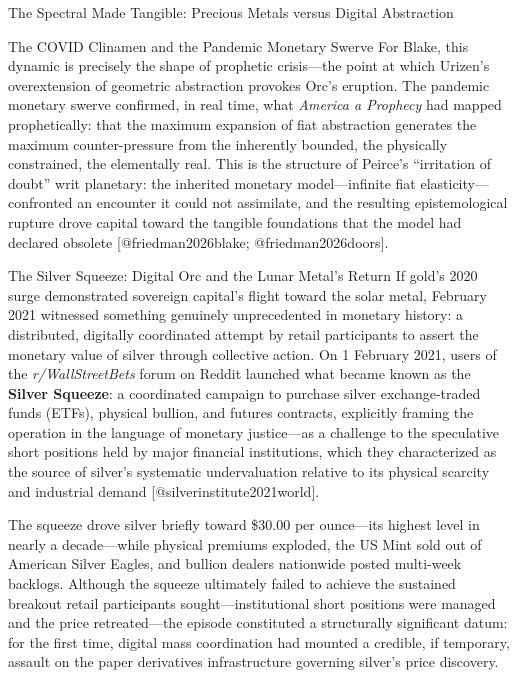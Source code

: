 \documentclass[
  ignorenonframetext,
]{beamer}
\begin{document}
\begin{frame}{The Spectral Made Tangible: Precious Metals versus Digital
Abstraction}
\begin{block}{The COVID Clinamen and the Pandemic Monetary Swerve}
For Blake, this dynamic is precisely the shape of prophetic crisis---the
point at which Urizen's overextension of geometric abstraction provokes
Orc's eruption. The pandemic monetary swerve confirmed, in real time,
what \emph{America a Prophecy} had mapped prophetically: that the
maximum expansion of fiat abstraction generates the maximum
counter-pressure from the inherently bounded, the physically
constrained, the elementally real. This is the structure of Peirce's
``irritation of doubt'' writ planetary: the inherited monetary
model---infinite fiat elasticity---confronted an encounter it could not
assimilate, and the resulting epistemological rupture drove capital
toward the tangible foundations that the model had declared obsolete
{[}@friedman2026blake; @friedman2026doors{]}.
\end{block}

\begin{block}{The Silver Squeeze: Digital Orc and the Lunar Metal's
Return}
\protect{}\label{the-silver-squeeze-digital-orc-and-the-lunar-metals-return}
If gold's 2020 surge demonstrated sovereign capital's flight toward the
solar metal, February 2021 witnessed something genuinely unprecedented
in monetary history: a distributed, digitally coordinated attempt by
retail participants to assert the monetary value of silver through
collective action. On 1 February 2021, users of the
\emph{r/WallStreetBets} forum on Reddit launched what became known as
the \textbf{Silver Squeeze}: a coordinated campaign to purchase silver
exchange-traded funds (ETFs), physical bullion, and futures contracts,
explicitly framing the operation in the language of monetary
justice---as a challenge to the speculative short positions held by
major financial institutions, which they characterized as the source of
silver's systematic undervaluation relative to its physical scarcity and
industrial demand {[}@silverinstitute2021world{]}.

The squeeze drove silver briefly toward \$30.00 per ounce---its highest
level in nearly a decade---while physical premiums exploded, the US Mint
sold out of American Silver Eagles, and bullion dealers nationwide
posted multi-week backlogs. Although the squeeze ultimately failed to
achieve the sustained breakout retail participants
sought---institutional short positions were managed and the price
retreated---the episode constituted a structurally significant datum:
for the first time, digital mass coordination had mounted a credible, if
temporary, assault on the paper derivatives infrastructure governing
silver's price discovery.


\end{block}
\end{frame}
\end{document}
